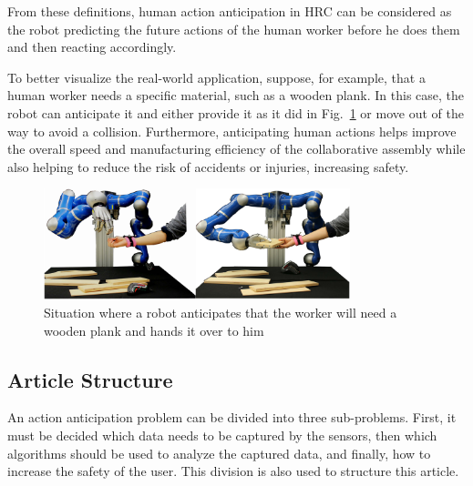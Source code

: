 { From these definitions, human action anticipation in HRC can be considered as the robot predicting the future actions of the human worker before he does them and then reacting accordingly.

To better visualize the real-world application, suppose, for example, that a human worker needs a specific material, such as a wooden plank. In this case, the robot can anticipate it and either provide it as it did in Fig.~\ref{example} or move out of the way to avoid a collision. Furthermore, anticipating human actions helps improve the overall speed and manufacturing efficiency of the collaborative assembly while also helping to reduce the risk of accidents or injuries, increasing safety.

\begin{figure}[htbp]
\centerline{\includegraphics[width=3.5in]{figs/example.PNG}}
\caption{Situation where a robot anticipates that the worker will need a wooden plank and hands it over to him \cite{Maeda2016}}
\label{example}
\end{figure}

\subsection{Article Structure}

An action anticipation problem can be divided into three sub-problems. First, it must be decided which data needs to be captured by the sensors, then which algorithms should be used to analyze the captured data, and finally, how to increase the safety of the user. This division is also used to structure this article.
}
